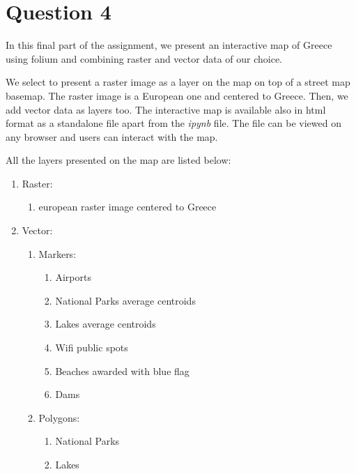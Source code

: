 \section{Question 4}
In this final part of the assignment, we present an interactive map of Greece using folium and combining raster and vector data of our choice.

We select to present a raster image as a layer on the map on top of a street map basemap. The raster image is a European one and centered to Greece. Then, we add vector data as layers too. The interactive map is available also in html format as a standalone file apart from the \emph{ipynb} file. The file can be viewed on any browser and users can interact with the map. 


All the layers presented on the map are listed below:

\begin{enumerate}
  \item Raster:
  \begin{enumerate}
      \item european raster image centered to Greece
  \end{enumerate}
  \item Vector:
  \begin{enumerate}
      \item Markers:
      \begin{enumerate}
          \item Airports
          \item National Parks average centroids
          \item Lakes average centroids
          \item Wifi public spots
          \item Beaches awarded with blue flag 
          \item Dams
      \end{enumerate}
      \item Polygons:
      \begin{enumerate}
          \item National Parks
          \item Lakes
      \end{enumerate}
  \end{enumerate}
\end{enumerate}

